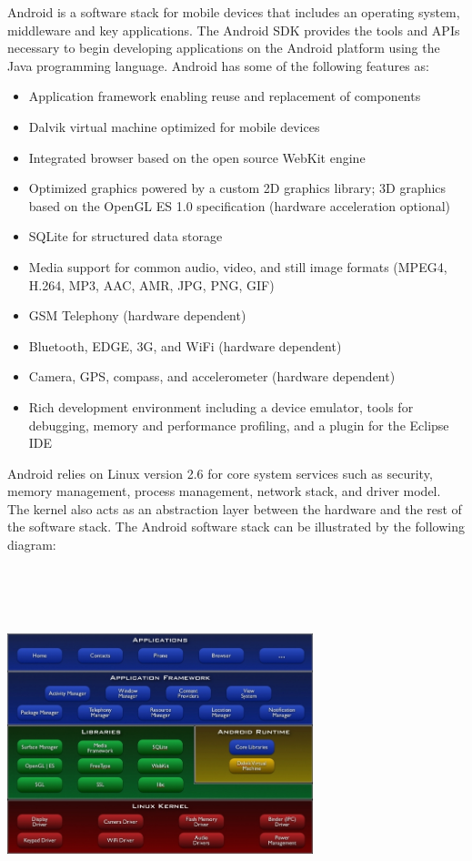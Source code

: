 \documentclass[%
	final,
	notitlepage,
	narroweqnarray,
	inline,
	twoside,
	]{ieee}
\begin{document}
\PARstartCal
Android is a software stack for mobile devices that includes an operating system, 
middleware and key applications. The Android SDK provides the tools and APIs 
necessary to begin developing applications on the Android platform using the Java 
programming language. Android has some of the following features as:

\begin{itemize}
\item Application framework enabling reuse and replacement of components
\item Dalvik virtual machine optimized for mobile devices
\item Integrated browser based on the open source WebKit engine
\item Optimized graphics powered by a custom 2D graphics library; 3D graphics based on the OpenGL ES 1.0 specification (hardware acceleration optional)
\item SQLite for structured data storage
\item Media support for common audio, video, and still image formats (MPEG4, H.264, MP3, AAC, AMR, JPG, PNG, GIF)
\item GSM Telephony (hardware dependent)
\item Bluetooth, EDGE, 3G, and WiFi (hardware dependent)
\item Camera, GPS, compass, and accelerometer (hardware dependent)
\item Rich development environment including a device emulator, tools for debugging, memory and performance profiling, and a plugin for the Eclipse IDE
\end{itemize}

Android relies on Linux version 2.6 for core system services such as security, 
memory management, process management, network stack, and driver model. The kernel 
also acts as an abstraction layer between the hardware and the rest of the software 
stack. The Android software stack can be illustrated by the following diagram:\\
\\
\includegraphics[height=100mm, width= 89mm]{images/system-architecture}\\[1mm]
\end{document}

